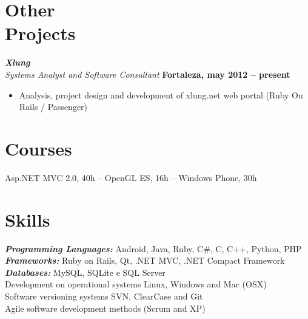 \documentclass[margin, 10pt]{res} %
\begin{document}
\begin{resume}
\section{Other \\ Projects}

{\sl\bf Xlung} \\
{\sl Systems Analyst and Software Consultant} \hfill {\bf Fortaleza, may 2012 -- present}
\begin{itemize} \itemsep -2pt 
\item Analysis, project design and development of xlung.net web portal (Ruby On Rails / Passenger)
\end{itemize} 

\section{Courses}
Asp.NET MVC 2.0, 40h -- OpenGL ES, 16h -- Windows Phone, 30h


\section{Skills}
{\sl\bf Programming Languages:}  Android, Java, Ruby, C\#, C, C++, Python, PHP \\
{\sl\bf Frameworks:} Ruby on Rails, Qt, .NET MVC, .NET Compact Framework \\
{\sl\bf Databases:} MySQL, SQLite e SQL Server \\
Development on operational systems Linux, Windows and Mac (OSX) \\
Software versioning systems SVN, ClearCase and Git \\
Agile software development methods (Scrum and XP) \\



\end{resume}
\end{document}
